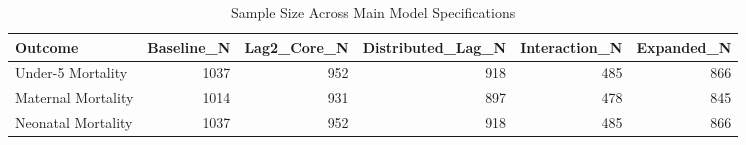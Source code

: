 \begin{table}

\caption{\label{tab:tab:sample_size_audit}Sample Size Across Main Model Specifications}
\centering
\begin{tabular}[t]{lrrrrr}
\toprule
Outcome & Baseline\_N & Lag2\_Core\_N & Distributed\_Lag\_N & Interaction\_N & Expanded\_N\\
\midrule
Under-5 Mortality & 1037 & 952 & 918 & 485 & 866\\
Maternal Mortality & 1014 & 931 & 897 & 478 & 845\\
Neonatal Mortality & 1037 & 952 & 918 & 485 & 866\\
\bottomrule
\end{tabular}
\end{table}
